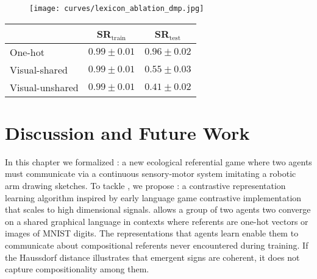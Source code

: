 \begin{figure}[!h]
\centering
 \texttt{[image: curves/lexicon\_ablation\_dmp.jpg]}
        \label{fig:lexicon_ablation}
\end{figure}
\begin{table}[!h]
\centering
        \small
        \begin{tabular}{|l|c|c|}    
        \hline
        & \textbf{SR}$_{\text{train}}$ & \textbf{SR}$_{\text{test}}$\\ \hline
        One-hot & $0.99 \pm 0.01$  & $0.96\pm0.02$  \\
        Visual-shared & $0.99 \pm 0.01$  & $0.55\pm0.03$  \\
        Visual-unshared & $0.99 \pm 0.01$ & $0.41 \pm 0.02$\\
        \hline
        \end{tabular}
        \label{tab:lexicon_ablation}
\end{table}


\section{Discussion and Future Work}

In this chapter we formalized \greg: a new ecological referential game where two agents must communicate via a continuous sensory-motor system imitating a robotic arm drawing sketches. To tackle \greg, we propose \curves: a contrastive representation learning algorithm inspired by early language game contrastive implementation that scales to high dimensional signals. \curves allows a group of two agents two converge on a shared graphical language in contexts where referents are one-hot vectors or images of MNIST digits. The representations that agents learn enable them to communicate about compositional referents never encountered during training. If the Haussdorf distance illustrates that emergent signs are coherent, it does not capture compositionality among them. 

